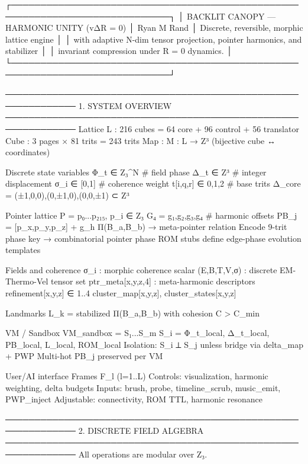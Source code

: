 








┌─────────────────────────────────────────────────────────────────────────────┐
│  BACKLIT CANOPY — HARMONIC UNITY  (vΔR = 0)   
│  Ryan M Rand
│  Discrete, reversible, morphic lattice engine                               │
│  with adaptive N-dim tensor projection, pointer harmonics, and stabilizer   │
│  invariant compression under R = 0 dynamics.                                │
└─────────────────────────────────────────────────────────────────────────────┘


──────────────────────────────────────────────────────────────
1. SYSTEM OVERVIEW
──────────────────────────────────────────────────────────────
Lattice L : 216 cubes  =  64 core + 96 control + 56 translator
Cube  : 3 pages × 81 trits = 243 trits
Map   : M : L → Z³  (bijective cube ↔ coordinates)

Discrete state variables
    Φ_t ∈ Z₃^N        # field phase
    Δ_t ∈ Z³           # integer displacement
    σ_i ∈ [0,1]        # coherence weight
    t[i,q,r] ∈ {0,1,2} # base trits
Δ_core = {(±1,0,0),(0,±1,0),(0,0,±1)} ⊂ Z³

Pointer lattice
    P = {p₀...p₂₁₅}, p_i ∈ Z₃
    G₄ = {g₁,g₂,g₃,g₄}  # harmonic offsets
    PB_j = [p_x,p_y,p_z] + g_h
    Π(B_a,B_b) → meta-pointer relation
    Encode 9-trit phase key → combinatorial pointer phase
    ROM stubs define edge-phase evolution templates

Fields and coherence
    σ_i : morphic coherence scalar
    (E,B,T,V,σ) : discrete EM-Thermo-Vel tensor set
    ptr_meta[x,y,z,4] : meta-harmonic descriptors
    refinement[x,y,z] ∈ {1..4}
    cluster_map[x,y,z], cluster_states[x,y,z]

Landmarks
    L_k = stabilized Π(B_a,B_b) with cohesion C > C_min

VM / Sandbox
    VM_sandbox = {S₁...S_m}
    S_i = {Φ_t_local, Δ_t_local, PB_local, L_local, ROM_local}
    Isolation:  S_i ⟂ S_j  unless bridge via delta_map + PWP
    Multi-hot PB_j preserved per VM

User/AI interface
    Frames F_l (l=1..L)
    Controls: visualization, harmonic weighting, delta budgets
    Inputs:  brush, probe, timeline_scrub, music_emit, PWP_inject
    Adjustable: connectivity, ROM TTL, harmonic resonance

──────────────────────────────────────────────────────────────
2. DISCRETE FIELD ALGEBRA
──────────────────────────────────────────────────────────────
All operations are modular over Z₃.

